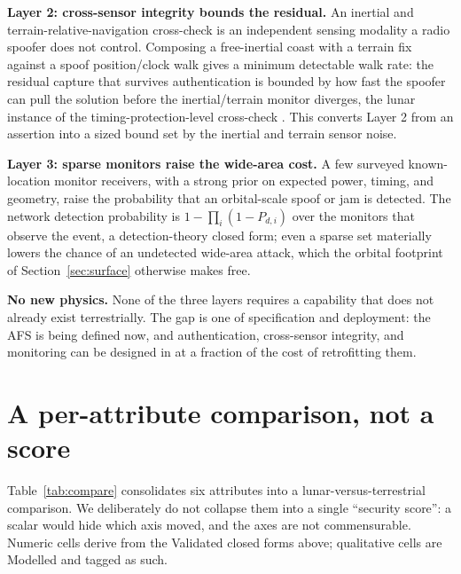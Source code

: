 \documentclass[conference]{IEEEtran}
\begin{document}
\textbf{Layer 2: cross-sensor integrity bounds the residual.} An inertial and
terrain-relative-navigation cross-check \cite{trn} is an independent sensing modality
a radio spoofer does not control. Composing a free-inertial coast with a
terrain fix against a spoof position/clock walk gives a minimum detectable walk rate:
the residual capture that survives authentication is bounded by how fast the spoofer
can pull the solution before the inertial/terrain monitor diverges, the lunar
instance of the timing-protection-level cross-check \cite{baweja2026tpl}. This
converts Layer 2 from an assertion into a sized bound set by the inertial and terrain
sensor noise.

\textbf{Layer 3: sparse monitors raise the wide-area cost.} A few surveyed
known-location monitor receivers, with a strong prior on expected power, timing, and
geometry, raise the probability that an orbital-scale spoof or jam is detected. The
network detection probability is $1-\prod_i(1-P_{d,i})$ over the monitors that
observe the event, a detection-theory closed form; even a sparse set materially
lowers the chance of an undetected wide-area attack, which the orbital footprint of
Section~\ref{sec:surface} otherwise makes free.

\textbf{No new physics.} None of the three layers requires a capability that does
not already exist terrestrially. The gap is one of specification and deployment: the
AFS is being defined now, and authentication, cross-sensor integrity, and monitoring
can be designed in at a fraction of the cost of retrofitting them.

\section{A per-attribute comparison, not a score}
\label{sec:compare}
Table~\ref{tab:compare} consolidates six attributes into a lunar-versus-terrestrial
comparison. We deliberately do not collapse them into a single ``security score'': a
scalar would hide which axis moved, and the axes are not commensurable. Numeric
cells derive from the Validated closed forms above; qualitative cells are Modelled
and tagged as such.
\end{document}
